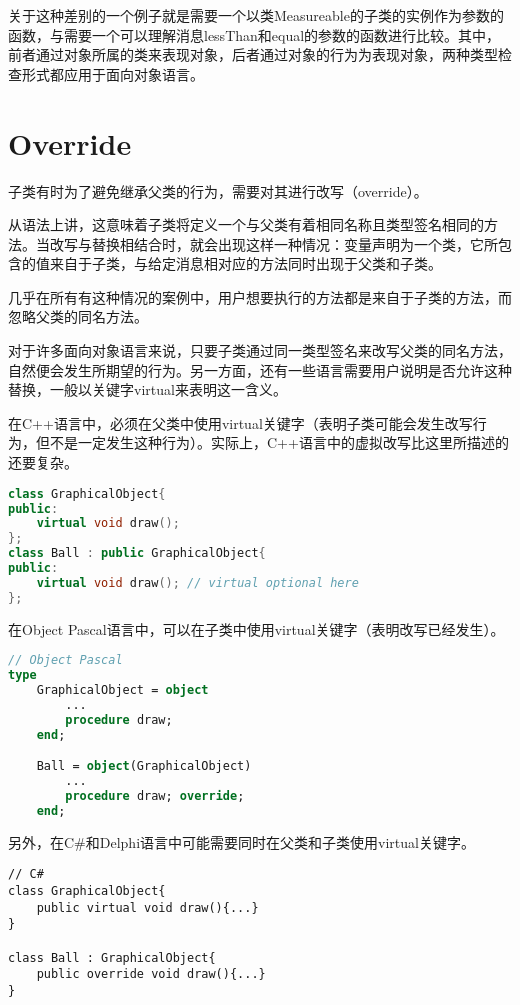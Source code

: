 关于这种差别的一个例子就是需要一个以类Measureable的子类的实例作为参数的函数，与需要一个可以理解消息lessThan和equal的参数的函数进行比较。其中，前者通过对象所属的类来表现对象，后者通过对象的行为为表现对象，两种类型检查形式都应用于面向对象语言。

\section{Override}

子类有时为了避免继承父类的行为，需要对其进行改写（override）。

从语法上讲，这意味着子类将定义一个与父类有着相同名称且类型签名相同的方法。当改写与替换相结合时，就会出现这样一种情况：变量声明为一个类，它所包含的值来自于子类，与给定消息相对应的方法同时出现于父类和子类。

几乎在所有有这种情况的案例中，用户想要执行的方法都是来自于子类的方法，而忽略父类的同名方法。

对于许多面向对象语言来说，只要子类通过同一类型签名来改写父类的同名方法，自然便会发生所期望的行为。另一方面，还有一些语言需要用户说明是否允许这种替换，一般以关键字virtual来表明这一含义。

在C++语言中，必须在父类中使用virtual关键字（表明子类可能会发生改写行为，但不是一定发生这种行为）。实际上，C++语言中的虚拟改写比这里所描述的还要复杂。

\begin{lstlisting}[language=C++]
class GraphicalObject{
public:
	virtual void draw();
};
class Ball : public GraphicalObject{
public:
	virtual void draw(); // virtual optional here	
};
\end{lstlisting}

在Object Pascal语言中，可以在子类中使用virtual关键字（表明改写已经发生）。


\begin{lstlisting}[language=Pascal]
// Object Pascal
type
	GraphicalObject = object
		...
		procedure draw;
	end;

	Ball = object(GraphicalObject)
		...
		procedure draw; override;
	end;
\end{lstlisting}

另外，在C\#和Delphi语言中可能需要同时在父类和子类使用virtual关键字。



\begin{lstlisting}[language={[Sharp]C}]
// C#
class GraphicalObject{
	public virtual void draw(){...}
}

class Ball : GraphicalObject{
	public override void draw(){...}
}
\end{lstlisting}

